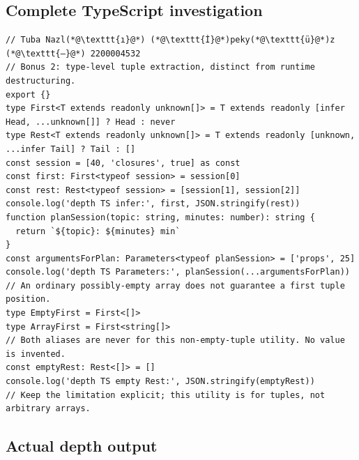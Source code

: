 \documentclass[
  10pt,
  a4paper,
]{article}
\begin{document}
\subsection{Complete TypeScript
investigation}\label{complete-typescript-investigation}

\begin{minipage}{\linewidth}

\begin{lstlisting}
// Tuba Nazl(*@\texttt{ı}@*) (*@\texttt{İ}@*)peky(*@\texttt{ü}@*)z (*@\texttt{—}@*) 2200004532
// Bonus 2: type-level tuple extraction, distinct from runtime destructuring.
export {}
type First<T extends readonly unknown[]> = T extends readonly [infer Head, ...unknown[]] ? Head : never
type Rest<T extends readonly unknown[]> = T extends readonly [unknown, ...infer Tail] ? Tail : []
const session = [40, 'closures', true] as const
const first: First<typeof session> = session[0]
const rest: Rest<typeof session> = [session[1], session[2]]
console.log('depth TS infer:', first, JSON.stringify(rest))
function planSession(topic: string, minutes: number): string {
  return `${topic}: ${minutes} min`
}
const argumentsForPlan: Parameters<typeof planSession> = ['props', 25]
console.log('depth TS Parameters:', planSession(...argumentsForPlan))
// An ordinary possibly-empty array does not guarantee a first tuple position.
type EmptyFirst = First<[]>
type ArrayFirst = First<string[]>
// Both aliases are never for this non-empty-tuple utility. No value is invented.
const emptyRest: Rest<[]> = []
console.log('depth TS empty Rest:', JSON.stringify(emptyRest))
// Keep the limitation explicit; this utility is for tuples, not arbitrary arrays.
\end{lstlisting}

\end{minipage}\par

\subsection{Actual depth output}\label{actual-depth-output}
\end{document}
